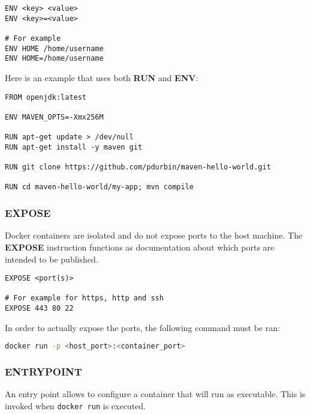 \documentclass{article}
\begin{document}
\begin{lstlisting}[language=docker,breaklines=true,label={code:compose}]
ENV <key> <value>
ENV <key>=<value>

# For example
ENV HOME /home/username
ENV HOME=/home/username
\end{lstlisting}
\vspace{.4cm}
Here is an example that uses both \textbf{RUN} and \textbf{ENV}: \\
\begin{lstlisting}[language=docker,breaklines=true,label={code:compose}]
FROM openjdk:latest

ENV MAVEN_OPTS=-Xmx256M

RUN apt-get update > /dev/null
RUN apt-get install -y maven git

RUN git clone https://github.com/pdurbin/maven-hello-world.git

RUN cd maven-hello-world/my-app; mvn compile
\end{lstlisting}

\subsubsection{EXPOSE}
Docker containers are isolated and do not expose ports to the host machine. The \textbf{EXPOSE} instruction functions as documentation about which ports are intended to be published. \\

\begin{lstlisting}[language=docker,breaklines=true,label={code:compose}]
EXPOSE <port(s)>

# For example for https, http and ssh
EXPOSE 443 80 22
\end{lstlisting}
\vspace{.4cm}
In order to actually expose the ports, the following command must be ran: \\

\begin{lstlisting}[language=bash,breaklines=true,label={code:compose}]
docker run -p <host_port>:<container_port>
\end{lstlisting}

\subsubsection{ENTRYPOINT}
An entry point allows to configure a container that will run as executable. This is invoked when \verb|docker run| is executed. \\
\end{document}
